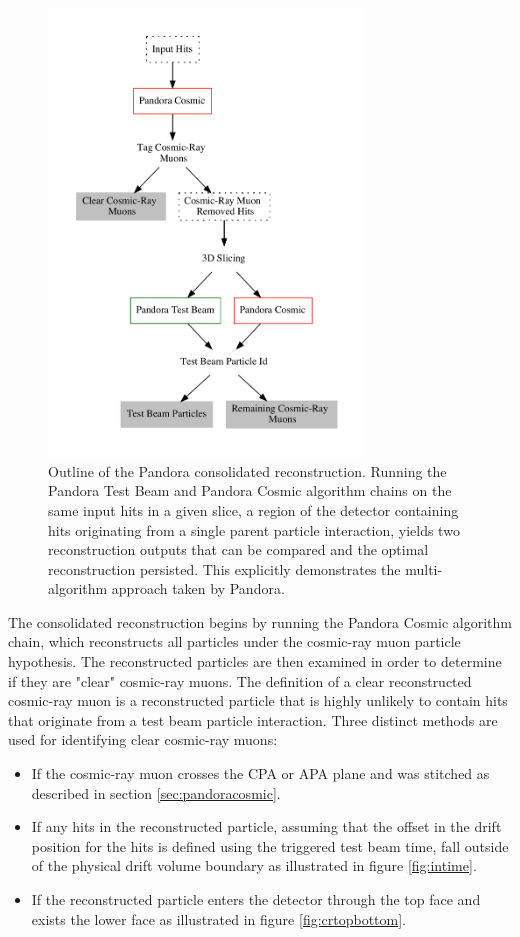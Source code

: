 \begin{figure}
\centering
\includegraphics[width=0.75\textwidth]{Figures/Diagram/ConsolidatedReco.pdf}
\caption{Outline of the Pandora consolidated reconstruction.  Running the Pandora Test Beam and Pandora Cosmic algorithm chains on the same input hits in a given slice, a region of the detector containing hits originating from a single parent particle interaction, yields two reconstruction outputs that can be compared and the optimal reconstruction persisted.  This explicitly demonstrates the multi-algorithm approach taken by Pandora.}
\label{fig:consolidatedreco}
\end{figure}

The consolidated reconstruction begins by running the Pandora Cosmic algorithm chain, which reconstructs all particles under the cosmic-ray muon particle hypothesis.  The reconstructed particles are then examined in order to determine if they are "clear" cosmic-ray muons.  The definition of a clear reconstructed cosmic-ray muon is a reconstructed particle that is highly unlikely to contain hits that originate from a test beam particle interaction.  Three distinct methods are used for identifying clear cosmic-ray muons:

\begin{itemize}
\item If the cosmic-ray muon crosses the CPA or APA plane and was stitched as described in section \ref{sec:pandoracosmic}.
\item If any hits in the reconstructed particle, assuming that the offset in the drift position for the hits is defined using the triggered test beam time, fall outside of the physical drift volume boundary as illustrated in figure \ref{fig:intime}.
\item If the reconstructed particle enters the detector through the top face and exists the lower face as illustrated in figure \ref{fig:crtopbottom}.
\end{itemize}

